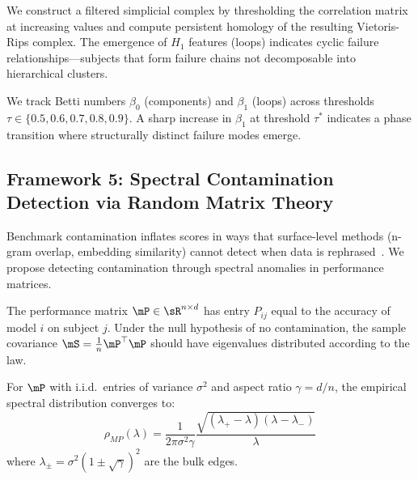 We construct a filtered simplicial complex by thresholding the correlation matrix at increasing values and compute persistent homology of the resulting Vietoris-Rips complex.
The emergence of $H_1$ features (loops) indicates cyclic failure relationships---subjects that form failure chains not decomposable into hierarchical clusters.

We track Betti numbers $\beta_0$ (components) and $\beta_1$ (loops) across thresholds $\tau \in \{0.5, 0.6, 0.7, 0.8, 0.9\}$.
A sharp increase in $\beta_1$ at threshold $\tau^*$ indicates a phase transition where structurally distinct failure modes emerge.

\subsection{Framework 5: Spectral Contamination Detection via Random Matrix Theory}
\label{sec:speccontam}

Benchmark contamination inflates scores in ways that surface-level methods (n-gram overlap, embedding similarity) cannot detect when data is rephrased~\citep{yang2023rethinking}.
We propose detecting contamination through spectral anomalies in performance matrices.

\begin{definition}
The performance matrix $\mP \in \sR^{n \times d}$ has entry $P_{ij}$ equal to the accuracy of model $i$ on subject $j$.
Under the null hypothesis of no contamination, the sample covariance $\mS = \frac{1}{n}\mP^\top \mP$ should have eigenvalues distributed according to the \marchpast law.
\end{definition}

\begin{theorem}
For $\mP$ with i.i.d.\ entries of variance $\sigma^2$ and aspect ratio $\gamma = d/n$, the empirical spectral distribution converges to:
\begin{equation}
\rho_{MP}(\lambda) = \frac{1}{2\pi\sigma^2\gamma}\frac{\sqrt{(\lambda_+ - \lambda)(\lambda - \lambda_-)}}{\lambda}
\end{equation}
where $\lambda_\pm = \sigma^2(1 \pm \sqrt{\gamma})^2$ are the bulk edges.
\end{theorem}

